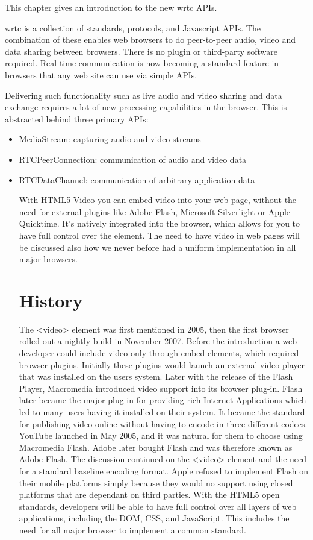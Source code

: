 

This chapter gives an introduction to the new \gls{wrtc} APIs.

\gls{wrtc} is a collection of standards, protocols, and Javascript APIs. The combination of these enables web browsers to do peer-to-peer audio, video and data sharing between browsers. There is no plugin or third-party software required. Real-time communication is now becoming a standard feature in browsers that any web site can use via simple APIs.

Delivering such functionality such as live audio and video sharing and data exchange requires a lot of new processing capabilities in the browser. This is abstracted behind three primary APIs:

\begin{itemize}
\item MediaStream: capturing audio and video streams
\item RTCPeerConnection: communication of audio and video data
\item RTCDataChannel: communication of arbitrary application data






With HTML5 Video you can embed video into your web page, without the need for external plugins like Adobe Flash, Microsoft Silverlight or Apple Quicktime. It’s natively integrated into the browser, which allows for you to have full control over the element. The need to have video in web pages will be discussed also how we never before had a uniform implementation in all major browsers.

\section{History}
The <video> element was first mentioned in 2005, then the first browser rolled out a nightly build in November 2007. Before the introduction a web developer could include video only through  embed elements, which required browser plugins. Initially these plugins would launch an external video player that was installed on the users system. Later with the release of the Flash Player, Macromedia introduced video support into its browser plug-in. Flash later became the major plug-in for providing rich Internet Applications which led to many users having it installed on their system. It became the standard for publishing video online without having to encode in three different codecs. YouTube launched in May 2005, and it was natural for them to choose using Macromedia Flash. Adobe later bought Flash and was therefore known as Adobe Flash. The discussion continued on the <video> element and the need for a standard baseline encoding format. Apple refused to implement Flash on their mobile platforms simply because they would no support using closed platforms that are dependant on third parties. With the HTML5 open standards, developers will be able to have full control over all layers of web applications, including the DOM, CSS, and JavaScript. This includes the need for all major browser to implement a common standard.


\end{itemize}
